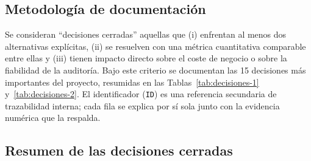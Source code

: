 \documentclass[11pt,a4paper]{article}
\begin{document}
\subsection{Metodología de documentación}

Se consideran ``decisiones cerradas'' aquellas que (i) enfrentan al menos dos alternativas
explícitas, (ii) se resuelven con una métrica cuantitativa comparable entre ellas y (iii) tienen
impacto directo sobre el coste de negocio o sobre la fiabilidad de la auditoría. Bajo este criterio
se documentan las 15 decisiones más importantes del proyecto, resumidas en las
Tablas~\ref{tab:decisiones-1} y~\ref{tab:decisiones-2}. El identificador (\texttt{ID}) es una
referencia secundaria de trazabilidad interna; cada fila se explica por sí sola junto con la
evidencia numérica que la respalda.

\subsection{Resumen de las decisiones cerradas}
\end{document}
